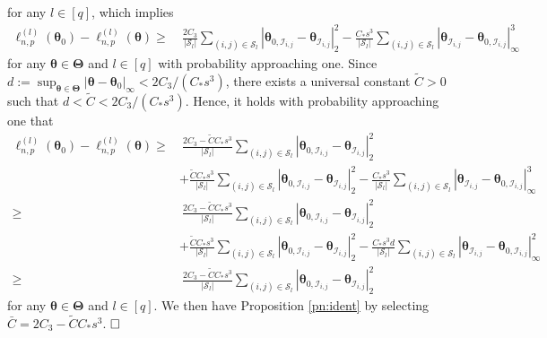 \documentclass[12pt]{article}
\newcommand{\bTheta}{\boldsymbol \Theta}
\newcommand{\btheta}{\boldsymbol \theta}
\newcommand{\0}{{\bf 0}}
\begin{document}
for any $l\in[q]$, which implies
\begin{align*}
\ell_{n,p}^{(l)}(\btheta_0)-\ell_{n,p}^{(l)}(\btheta)\geq&~ \frac{2C_3}{|\mathcal{S}_l|}\sum_{(i,j)\in\mathcal{S}_l}|\btheta_{0,\mathcal{I}_{i,j}}-\btheta_{\mathcal{I}_{i,j}}|_2^2-\frac{C_*s^3}{|\mathcal{S}_l|}\sum_{(i,j)\in\mathcal{S}_l}|\btheta_{\mathcal{I}_{i,j}}-\btheta_{0,\mathcal{I}_{i,j}}|_\infty^3
\end{align*}
for any $\btheta\in\bTheta$ and $l\in[q]$ with probability approaching one. Since $d:=\sup_{\btheta\in\bTheta}|\btheta-\btheta_0|_\infty<2C_3/(C_*s^3)$, there exists a universal constant $\tilde{C}>0$ such that $d<\tilde{C}<2C_3/(C_*s^3)$. Hence, it holds with probability approaching one that
\begin{align*}
\ell_{n,p}^{(l)}(\btheta_0)-\ell_{n,p}^{(l)}(\btheta)\geq&~ \frac{2C_3-\tilde{C}C_*s^3}{|\mathcal{S}_l|}\sum_{(i,j)\in\mathcal{S}_l}|\btheta_{0,\mathcal{I}_{i,j}}-\btheta_{\mathcal{I}_{i,j}}|_2^2\\
&+\frac{\tilde{C}C_*s^3}{|\mathcal{S}_l|}\sum_{(i,j)\in\mathcal{S}_l}|\btheta_{0,\mathcal{I}_{i,j}}-\btheta_{\mathcal{I}_{i,j}}|_2^2-\frac{C_*s^3}{|\mathcal{S}_l|}\sum_{(i,j)\in\mathcal{S}_l}|\btheta_{\mathcal{I}_{i,j}}-\btheta_{0,\mathcal{I}_{i,j}}|_\infty^3\\
\geq&~\frac{2C_3-\tilde{C}C_*s^3}{|\mathcal{S}_l|}\sum_{(i,j)\in\mathcal{S}_l}|\btheta_{0,\mathcal{I}_{i,j}}-\btheta_{\mathcal{I}_{i,j}}|_2^2\\
&+\frac{\tilde{C}C_*s^3}{|\mathcal{S}_l|}\sum_{(i,j)\in\mathcal{S}_l}|\btheta_{0,\mathcal{I}_{i,j}}-\btheta_{\mathcal{I}_{i,j}}|_2^2-\frac{C_*s^3d}{|\mathcal{S}_l|}\sum_{(i,j)\in\mathcal{S}_l}|\btheta_{\mathcal{I}_{i,j}}-\btheta_{0,\mathcal{I}_{i,j}}|_\infty^2\\
\geq&~\frac{2C_3-\tilde{C}C_*s^3}{|\mathcal{S}_l|}\sum_{(i,j)\in\mathcal{S}_l}|\btheta_{0,\mathcal{I}_{i,j}}-\btheta_{\mathcal{I}_{i,j}}|_2^2
\end{align*}
for any $\btheta\in\bTheta$ and $l\in[q]$. 
We then have Proposition \ref{pn:ident} by selecting $\bar{C}=2C_3-\tilde{C}C_*s^3$. 
$\hfill\Box$

\end{document}
